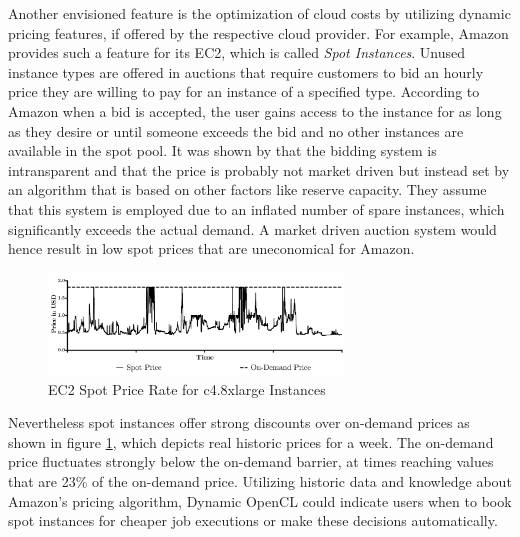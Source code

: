 Another envisioned feature is the optimization of cloud costs by utilizing dynamic pricing features, if offered by the respective cloud provider. For example, Amazon provides such a feature for its EC2, which is called \textit{Spot Instances}. Unused instance types are offered in auctions that require customers to bid an hourly price they are willing to pay for an instance of a specified type. According to Amazon when a bid is accepted, the user gains access to the instance for as long as they desire or until someone exceeds the bid and no other instances are available in the spot pool\cite{spot_instances}. It was shown by \citeauthor{spot_instance_pricing} that the bidding system is intransparent and that the price is probably not market driven but instead set by an algorithm that is based on other factors like reserve capacity\cite{spot_instance_pricing}. They assume that this system is employed due to an inflated number of spare instances, which significantly exceeds the actual demand. A market driven auction system would hence result in low spot prices that are uneconomical for Amazon.
\begin{figure}[!htb]
	\includegraphics[width=0.7\textwidth]{images/ec2_spot_prices.pdf}
	\centering
	\caption{EC2 Spot Price Rate for c4.8xlarge Instances}
	\label{img:spot_pricing}
\end{figure}
Nevertheless spot instances offer strong discounts over on-demand prices as shown in figure \ref{img:spot_pricing}, which depicts real historic prices for a week. The on-demand price fluctuates strongly below the on-demand barrier, at times reaching values that are 23\% of the on-demand price. Utilizing historic data and knowledge about Amazon's pricing algorithm, Dynamic OpenCL could indicate users when to book spot instances for cheaper job executions or make these decisions automatically.
